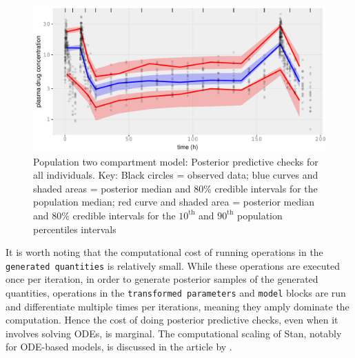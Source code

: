 \begin{figure}
  \begin{center}
  \includegraphics[width=6in]{../figures/twocpt_pop_ppc3.pdf}
  \end{center}
  \caption{Population two compartment model: Posterior predictive
    checks for all individuals. Key: Black circles = observed data; blue
    curves and shaded areas = posterior median and 80\% credible
    intervals for the population median; red curve and shaded area =
    posterior median and 80\% credible intervals for the $10^\text{th}$ and $90^\text{th}$
    population percentiles
    intervals }
  \label{fig:twoCptPop_ppc}
\end{figure}

It is worth noting that the computational cost of running operations in the \texttt{generated quantities} is relatively small.
While these operations are executed once per iteration, in order to generate posterior samples of the generated quantities, operations in the \texttt{transformed parameters} and \texttt{model} blocks are run and differentiate multiple times per iterations, meaning they amply dominate the computation.
Hence the cost of doing posterior predictive checks, even when it involves solving ODEs, is marginal.
The computational scaling of Stan, notably for ODE-based models, is discussed in the article by \citet{Grinsztajn:2021}.
